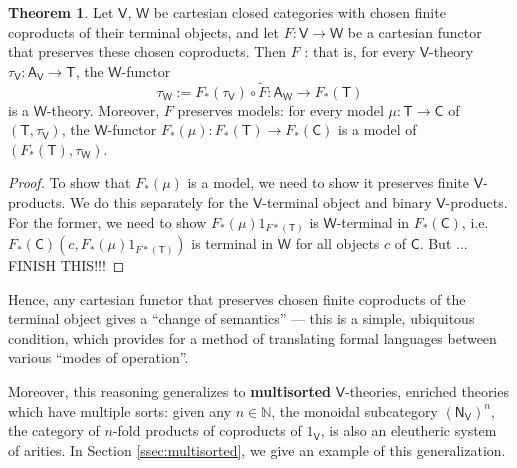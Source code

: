 \documentclass{amsart}
\newcommand{\define}[1]{{\bf \boldmath{#1}}}
\theoremstyle{definition}
\newtheorem{theorem}{Theorem}
\newcommand{\NN}{\mathsf{N}}
\newcommand{\A}{\mathsf{A}}
\newcommand{\V}{\mathsf{V}}
\newcommand{\W}{\mathsf{W}}
\newcommand{\D}{\mathsf{D}}
\newcommand{\C}{\mathsf{C}}
\newcommand{\T}{\mathsf{T}}
\newcommand{\maps}{\colon}
\begin{document}
\begin{theorem}
\label{thm:change-of-base}
Let $\V$, $\W$ be cartesian closed categories with chosen finite coproducts of their terminal objects, and let $F\maps \V \to \W$ be a cartesian functor that preserves these chosen coproducts.  Then $F$ \define{preserves enriched theories}: that is, for every $\V$-theory $\tau_\V\maps \A_\V\to \T$, the $\W$-functor 
\[ \tau_\W := F_*(\tau_\V) \circ \tilde{F} \maps \A_\W \to F_*(\T)\]
is a $\W$-theory. Moreover, $F$ preserves models: for every model $\mu \maps\T \to \C$
of $(\T,\tau_\V) $, the $\W$-functor $F_*(\mu) \maps F_*(\T) \to F_*(\C)$ is a model of 
$(F_*(\T), \tau_\W)$.
\end{theorem}

\begin{proof}
To show that $F_*(\mu)$ is a model, we need
to show it preserves finite $\V$-products.   We do this separately for the $\V$-terminal object and
binary $\V$-products.  For the former, we need to show $F_*(\mu) 1_{F*(\T)}$ is $\W$-terminal
in $F_*(\C)$, i.e.\ $F_*(\C) (c, F_*(\mu) 1_{F*(\T)}) $ is terminal in $\W$ for all objects
$c$ of $\C$.  But ...   FINISH THIS!!!

\iffalse
	\[\begin{array}{rcll}
	F_*(\D)(F_*(f)(a),F_*(f)(s^{n_\V})) & = & F(\D(f(a),f(t^{n_\V})) & \text{definition of base change}\\
	& \cong & F(\D(f(a),f(t)^{n_\V}) & f \text{ preserves } \NN_\V \text{-powers}\\
	& \cong & F(\D(f(a),f(t))^n) & \text{Lemma \ref{lem:powers_1} for } \V\\
	& \cong & F(\D(f(a),f(t)))^n & F \text{preserves $\V$-products}\\
	& = & F_*(\D)(f(a),f(t))^n & \text{definition of base change}\\
	& \cong & F_*(\D)(f(a),f(t)^{n_\W}) & \text{Lemma \ref{lem:powers_1} for } \W. \qedhere
	\end{array}\]
	\fi
\end{proof}

Hence, any cartesian functor that preserves chosen finite coproducts of the terminal object gives a ``change of semantics'' --- this is a simple, ubiquitous condition, which provides for a method of translating formal languages between various ``modes of operation''.

Moreover, this reasoning generalizes to \textbf{multisorted} $\V$-theories, enriched theories which have multiple sorts: given any $n\in \mathbb{N}$, the monoidal subcategory $(\NN_\V)^n$, the category of $n$-fold products of coproducts of $1_\V$, is also an eleutheric system of arities.   In Section \ref{ssec:multisorted}, we give an example of this generalization.\\
\end{document}
